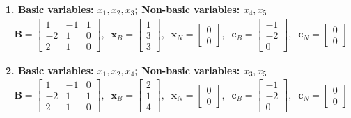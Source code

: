 \documentclass[11pt]{article}
\newcommand{\mb}[1]{\ensuremath{\boldsymbol{#1}}}
\begin{document}
\begin{enumerate}
\begin{enumerate}
		\textbf{1. Basic variables: $x_1, x_2, x_3$; Non-basic variables: $x_4, x_5$}
		\begin{align*}
		\mb{B} = \begin{bmatrix} 1 & -1 & 1 \\ -2 & 1 & 0 \\ 2 & 1 & 0 \end{bmatrix}, \;\; 
		\mb{x}_B = \begin{bmatrix} 1 \\ 3 \\ 3 \end{bmatrix}, \;\; 
		\mb{x}_N = \begin{bmatrix} 0 \\ 0 \end{bmatrix}, \;\; 
		\mb{c}_B = \begin{bmatrix} -1 \\ -2 \\ 0 \end{bmatrix}, \;\; 
		\mb{c}_N = \begin{bmatrix} 0 \\ 0 \end{bmatrix}
		\end{align*}
		
		\textbf{2. Basic variables: $x_1, x_2, x_4$; Non-basic variables: $x_3, x_5$}
		\begin{align*}
		\mb{B} = \begin{bmatrix} 1 & -1 & 0 \\ -2 & 1 & 1 \\ 2 & 1 & 0 \end{bmatrix}, \;\; 
		\mb{x}_B = \begin{bmatrix} 2 \\ 1 \\ 4 \end{bmatrix}, \;\; 
		\mb{x}_N = \begin{bmatrix} 0 \\ 0 \end{bmatrix}, \;\; 
		\mb{c}_B = \begin{bmatrix} -1 \\ -2 \\ 0 \end{bmatrix}, \;\; 
		\mb{c}_N = \begin{bmatrix} 0 \\ 0 \end{bmatrix}
		\end{align*}
		

\end{enumerate}
\end{enumerate}
\end{document}
